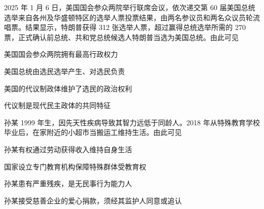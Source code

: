 \documentclass{exam-zh}
\begin{document}
\begin{question}
  2025 年 1 月 6 日，美国国会参众两院举行联席会议，依次递交第 60 届美国总统选举来自各州及华盛顿特区的选举人票投票结果，由两名参议员和两名众议员轮流唱票。结果显示，特朗普获得 312 张选举人票，超过赢得总统选举所需的 270 票，正式确认前总统、共和党总统候选人特朗普当选为美国总统。由此可见

   美国国会参众两院拥有最高行政权力

   美国总统由选民选举产生、对选民负责

   美国的代议制政体维护了选民的政治权利

   代议制是现代民主政体的共同特征

  \begin{choices}
  \item {}
  \item {}
  \item {}
  \item {}
  \end{choices}
\end{question}

\begin{question}
  孙某 1999 年生，因先天性疾病导致其智力远低于同龄人。2018 年从特殊教育学校毕业后，在家附近的小超市当搬运工维持生活。由此可见

   孙某有权通过劳动获得收入维持自身生活

   国家设立专门教育机构保障特殊群体受教育权

   孙某患有严重残疾，是无民事行为能力人

   孙某接受慈善企业的爱心捐款，须经其监护人同意或追认

  \begin{choices}
  \item {}
  \item {}
  \item {}
  \item {}
  \end{choices}
\end{question}
\end{document}
